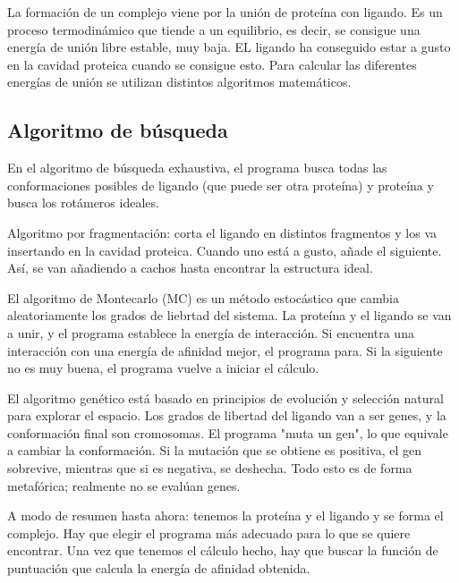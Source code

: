 La formación de un complejo viene por la unión de proteína con ligando. Es un proceso termodinámico que tiende a un equilibrio, es decir, se consigue una energía de unión libre estable, muy baja. EL ligando ha conseguido estar a gusto en la cavidad proteica cuando se consigue esto. Para calcular las diferentes energías de unión se utilizan distintos algoritmos matemáticos.

\subsection{Algoritmo de búsqueda}
En el algoritmo de búsqueda exhaustiva, el programa busca todas las conformaciones posibles de ligando (que puede ser otra proteína) y proteína y busca los rotámeros ideales.

Algoritmo por fragmentación: corta el ligando en distintos fragmentos y los va insertando en la cavidad proteica. Cuando uno está a gusto, añade el siguiente. Así, se van añadiendo a cachos hasta encontrar la estructura ideal.

El algoritmo de Montecarlo (MC) es un método estocástico que cambia aleatoriamente los grados de liebrtad del sistema. La proteína y el ligando se van a unir, y el programa establece la energía de interacción. Si encuentra una interacción con una energía de afinidad mejor, el programa para. Si la siguiente no es muy buena, el programa vuelve a iniciar el cálculo. 

El algoritmo genético está basado en principios de evolución y selección natural para explorar el espacio. Los grados de libertad del ligando van a ser genes, y la conformación final son cromosomas. El programa "muta un gen", lo que equivale a cambiar la conformación. Si la mutación que se obtiene es positiva, el gen sobrevive, mientras que si es negativa, se deshecha. Todo esto es de forma metafórica; realmente no se evalúan genes.

A modo de resumen hasta ahora: tenemos la proteína y el ligando y se forma el complejo. Hay que elegir el programa más adecuado para lo que se quiere encontrar. Una vez que tenemos el cálculo hecho, hay que buscar la función de puntuación que calcula la energía de afinidad obtenida.

